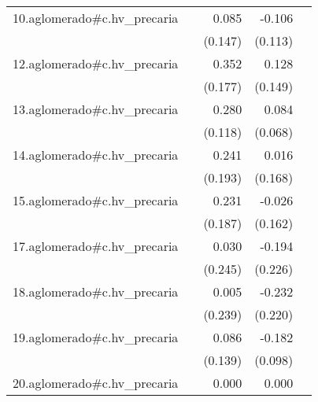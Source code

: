 {\begin{longtable}{l*{4}{D{.}{.}{-1}}}
\addlinespace
10.aglomerado#c.hv\_precaria&                     &       0.085         &      -0.106         &                     \\
            &                     &     (0.147)         &     (0.113)         &                     \\
\addlinespace
12.aglomerado#c.hv\_precaria&                     &       0.352\sym{*}  &       0.128         &                     \\
            &                     &     (0.177)         &     (0.149)         &                     \\
\addlinespace
13.aglomerado#c.hv\_precaria&                     &       0.280\sym{*}  &       0.084         &                     \\
            &                     &     (0.118)         &     (0.068)         &                     \\
\addlinespace
14.aglomerado#c.hv\_precaria&                     &       0.241         &       0.016         &                     \\
            &                     &     (0.193)         &     (0.168)         &                     \\
\addlinespace
15.aglomerado#c.hv\_precaria&                     &       0.231         &      -0.026         &                     \\
            &                     &     (0.187)         &     (0.162)         &                     \\
\addlinespace
17.aglomerado#c.hv\_precaria&                     &       0.030         &      -0.194         &                     \\
            &                     &     (0.245)         &     (0.226)         &                     \\
\addlinespace
18.aglomerado#c.hv\_precaria&                     &       0.005         &      -0.232         &                     \\
            &                     &     (0.239)         &     (0.220)         &                     \\
\addlinespace
19.aglomerado#c.hv\_precaria&                     &       0.086         &      -0.182         &                     \\
            &                     &     (0.139)         &     (0.098)         &                     \\
\addlinespace
20.aglomerado#c.hv\_precaria&                     &       0.000         &       0.000         &                     \\

\end{longtable}}
